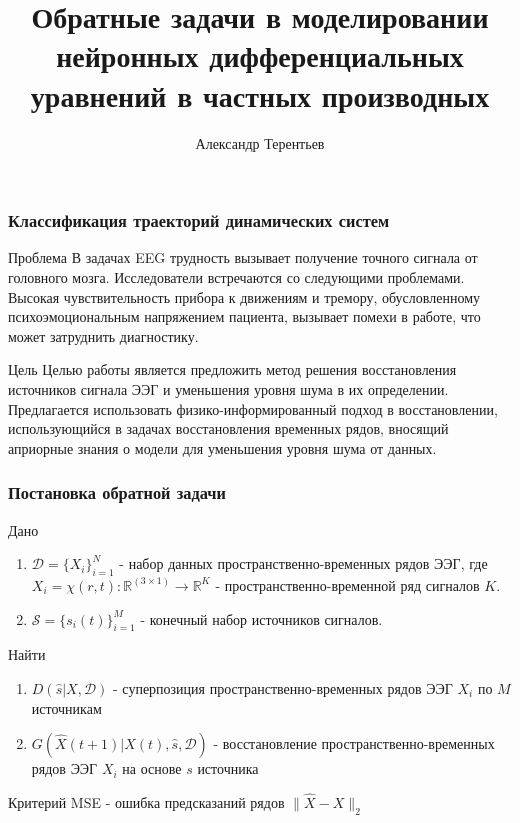 \documentclass{beamer}
\title[Обратные задачи моделирования nPDE] %
{Обратные задачи в моделировании нейронных дифференциальных уравнений в частных производных}
\author[А. Терентьев] %
{Александр Терентьев}
\institute[MIPT] %
{
  
  Московский физико-технический институт, 
  
  Физтех-школа прикладной математики и информатики\\

  Кафедра интеллектуальных систем

  Научный руководитель: д.ф .- м.н. Стрижов Вадим Викторович

}
\begin{document}
\frame{\titlepage}





\begin{frame}
\frametitle{Классификация траекторий динамических систем}
\begin{block}{Проблема}
В задачах EEG трудность вызывает получение точного сигнала от головного мозга. Исследователи встречаются со следующими проблемами. Высокая чувствительность прибора к движениям и тремору, обусловленному психоэмоциональным напряжением пациента, вызывает помехи в работе, что может затруднить диагностику. 
\end{block}
\begin{block}{Цель}
Целью работы является предложить метод решения восстановления источников сигнала ЭЭГ и уменьшения уровня шума в их определении.
Предлагается использовать физико-информированный подход в восстановлении, использующийся в задачах восстановления временных рядов, вносящий априорные знания о модели для уменьшения уровня шума от данных.
\end{block}

\end{frame}

\begin{frame}
\frametitle{Постановка обратной задачи}

\begin{block}{Дано}
\begin{enumerate}
    \item $\mathcal{D} = \{X_i\}_{i=1}^N$ - набор данных пространственно-временных рядов ЭЭГ, где $X_i = \chi(r, t): \mathbb{R}^(3\times1) \to \mathbb{R}^{K}$ - пространственно-временной ряд сигналов $K$.
    \item $\mathcal{S} = \{s_i(t)\}_{i=1}^M$ - конечный набор источников сигналов. 
\end{enumerate}
\end{block}
\begin{block}{Найти}
\begin{enumerate}
    \item $D(\hat{s}|X, \mathcal{D})$ - суперпозиция пространственно-временных рядов ЭЭГ $X_i$ по $M$ источникам

    \item $G(\hat{X}(t+1)|X(t), \hat{s}, \mathcal{D})$ - восстановление пространственно-временных рядов ЭЭГ $X_i$ на основе $s$ источника
\end{enumerate}
\end{block}
\begin{block}{Критерий}
MSE - ошибка предсказаний рядов $\|\hat{X} - {X}\|_2$
\end{block}
\end{frame}
\end{document}
